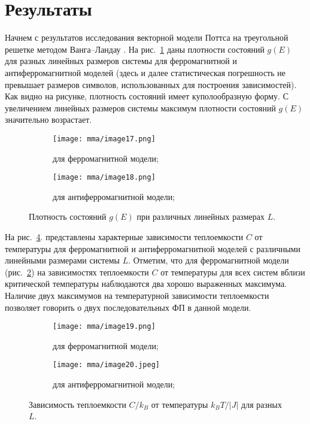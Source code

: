 \section{Результаты}
Начнем с результатов исследования векторной модели Поттса на треугольной решетке методом Ванга--Ландау \cite{bib:mma-9, bib:mma-10, bib:mma-11}.
На рис.~\ref{fig:mma-2} даны плотности состояний $g(E)$ для разных линейных размеров системы для ферромагнитной и антиферромагнитной моделей (здесь и далее статистическая погрешность не превышает размеров символов, использованных для построения зависимостей). Как видно на рисунке, плотность состояний имеет куполообразную форму. С увеличением линейных размеров системы максимум плотности состояний $g(E)$ значительно возрастает.
\begin{figure}[ht]
    \begin{subfigure}{0.5\textwidth}
        \texttt{[image: mma/image17.png]}
        \caption{для ферромагнитной модели;}
    \end{subfigure}
    \begin{subfigure}{0.5\textwidth}
        \texttt{[image: mma/image18.png]}
        \caption{для антиферромагнитной модели;}
    \end{subfigure}
    \caption{Плотность состояний $g(E)$ при различных линейных размерах $L$.}
    \label{fig:mma-2}
\end{figure}

На рис.~\ref{fig:mma-3}. представлены характерные зависимости теплоемкости $C$ от температуры для ферромагнитной и антиферромагнитной моделей с различными линейными размерами системы $L$. Отметим, что для ферромагнитной модели (рис.~\ref{fig:mma-3a}) на зависимостях теплоемкости $C$ от температуры для всех систем вблизи критической температуры наблюдаются два хорошо выраженных максимума. Наличие двух максимумов на температурной зависимости теплоемкости позволяет говорить о двух последовательных ФП в данной модели.
\begin{figure}[ht]
    \begin{subfigure}{0.5\textwidth}
        \texttt{[image: mma/image19.png]}
        \caption{для ферромагнитной модели;}
        \label{fig:mma-3a}
    \end{subfigure}
    \begin{subfigure}{0.5\textwidth}
        \texttt{[image: mma/image20.jpeg]}
        \caption{для антиферромагнитной модели;}
        \label{fig:mma-3b}
    \end{subfigure}
    \caption{Зависимость теплоемкости $C/k_B$ от температуры $k_B T/ \left|J\right|$ для разных $L$.}
    \label{fig:mma-3}
\end{figure}

